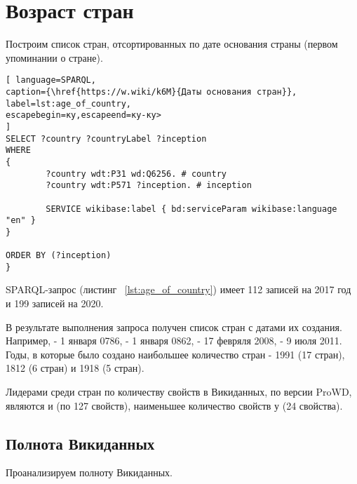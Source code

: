 \section{Возраст стран}

Построим список стран, отсортированных по дате основания страны (первом упоминании о стране).



\begin{lstlisting}[ language=SPARQL, 
caption={\href{https://w.wiki/k6M}{Даты основания стран}},
label=lst:age_of_country, 
escapebegin=ку,escapeend=ку-ку>
]
SELECT ?country ?countryLabel ?inception
WHERE
{
		?country wdt:P31 wd:Q6256. # country
		?country wdt:P571 ?inception. # inception
		
		SERVICE wikibase:label { bd:serviceParam wikibase:language "en" }
}

ORDER BY (?inception)
}
\end{lstlisting}

SPARQL-запрос (листинг ~\ref{lst:age_of_country}) имеет 112 записей на 2017 год и 199 записей на 2020.

В результате выполнения запроса получен список стран с датами их создания. Например,  - 1 января 0786,  - 1 января 0862,  - 17 февряля 2008,  - 9 июля 2011. Годы, в которые было создано наибольшее количество стран - 1991 (17 стран), 1812 (6 стран) и 1918 (5 стран).

Лидерами среди стран по количеству свойств в Викиданных, по версии ProWD, являются  и  (по 127 свойств), наименьшее количество свойств у  (24 свойства).

\subsection{Полнота Викиданных}

Проанализируем полноту Викиданных.

